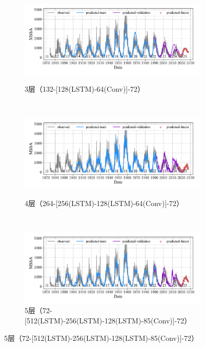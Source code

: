 \begin{figure}[!htbp]
  \centering
  \begin{subfigure}[b]{1.0\textwidth}
    \caption{3层（132-[128(LSTM)-64(Conv)]-72）} 
    \vspace{-0.35cm}
    \includegraphics[width=\textwidth]{Img/chap3_ss/ssa_series_in_132_out_72_layer_3_layersize_128_lstm_cnn.pdf}
    \label{fig:ssa_series_in_132_out_72_layer_3_layersize_128_lstm_cnn}
  \end{subfigure}    \\
  \vspace{-1cm}
  \begin{subfigure}[b]{1.0\textwidth}
    \caption{4层（264-[256(LSTM)-128(LSTM)-64(Conv)]-72）}
    \vspace{-0.35cm}
    \includegraphics[width=\textwidth]{Img/chap3_ss/ssa_series_in_264_out_72_layer_4_layersize_256_lstm_cnn.pdf}
    \label{fig:ssa_series_in_264_out_72_layer_4_layersize_256_lstm_cnn}
  \end{subfigure} \\
  \vspace{-1cm}
  \begin{subfigure}[b]{1.0\textwidth}
    \caption{5层（72-[512(LSTM)-256(LSTM)-128(LSTM)-85(Conv)]-72）}
    \vspace{-0.35cm}
    \includegraphics[width=\textwidth]{Img/chap3_ss/ssa_series_in_72_out_72_layer_5_layersize_512_lstm_cnn.pdf}

\end{subfigure}
\end{figure}
